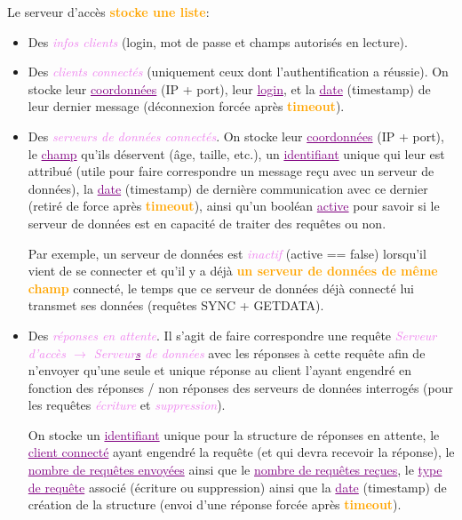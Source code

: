 \documentclass[a4paper]{article}
\newcommand{\ra}{\rightarrow}
\let\oldtextbf\textbf
\renewcommand{\textbf}[1]{\textcolor{orange}{\oldtextbf{#1}}}
\let\oldunderline\underline{}
\renewcommand{\underline}[1]{\textcolor{purple}{\oldunderline{#1}}}
\let\oldtextit\textit
\renewcommand{\textit}[1]{\textcolor{violet}{\oldtextit{#1}}}
\begin{document}
Le serveur d'accès \textbf{stocke une liste}:
\begin{itemize}
    \item Des \textit{infos clients} (login, mot de passe et champs autorisés en lecture).

    \item Des \textit{clients connectés} (uniquement ceux dont l'authentification a réussie). On stocke leur \underline{coordonnées} (IP + port), leur \underline{login}, et la \underline{date} (timestamp) de leur dernier message (déconnexion forcée après \textbf{timeout}).

    \item Des \textit{serveurs de données connectés}. On stocke leur \underline{coordonnées} (IP + port), le \underline{champ} qu'ils déservent (âge, taille, etc.), un \underline{identifiant} unique qui leur est attribué (utile pour faire correspondre un message reçu avec un serveur de données), la \underline{date} (timestamp) de dernière communication avec ce dernier (retiré de force après \textbf{timeout}), ainsi qu'un booléan \underline{active} pour savoir si le serveur de données est en capacité de traiter des requêtes ou non.

    Par exemple, un serveur de données est \textit{inactif} (active == false) lorsqu'il vient de se connecter et qu'il y a déjà \textbf{un serveur de données de même champ} connecté, le temps que ce serveur de données déjà connecté lui transmet ses données (requêtes SYNC + GETDATA).

    \item Des \textit{réponses en attente}. Il s'agit de faire correspondre une requête \textit{Serveur d'accès $\ra$ Serveur\underline{s} de données} avec les réponses à cette requête afin de n'envoyer qu'une seule et unique réponse au client l'ayant engendré en fonction des réponses / non réponses des serveurs de données interrogés (pour les requêtes \textit{écriture} et \textit{suppression}).

    On stocke un \underline{identifiant} unique pour la structure de réponses en attente, le \underline{client connecté} ayant engendré la requête (et qui devra recevoir la réponse), le \underline{nombre de requêtes envoyées} ainsi que le \underline{nombre de requêtes reçues}, le \underline{type de requête} associé (écriture ou suppression) ainsi que la \underline{date} (timestamp) de création de la structure (envoi d'une réponse forcée après \textbf{timeout}).
\end{itemize}
\end{document}
